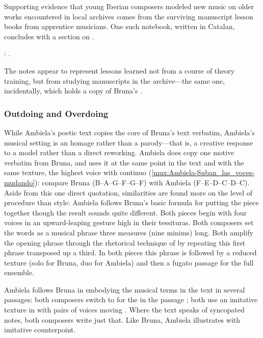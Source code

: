 Supporting evidence that young Iberian composers modeled new music on older
works encountered in local archives comes from the surviving manuscript lesson
books from apprentice musicians.
One such notebook, written in Catalan, concludes with a section on .%
\begin{Footnote}
    : .
\end{Footnote}
The notes appear to represent lessons learned not from a course of theory
training, but from studying manuscripts in the archive---the same one,
incidentally, which holds a copy of Bruna's .

\subsubsection{Outdoing and Overdoing}

While Ambiela's poetic text copies the core of Bruna's text verbatim, Ambiela's
musical setting is an homage rather than a parody---that is, a creative
response to a model rather than a direct reworking.
Ambiela does copy one motive verbatim from Bruna, and uses it at the same point
in the text and with the same texture, the highest voice with continuo
(\cref{mux:Ambiela-Suban_las_voces-mudando}): compare Bruna 
(B\fl--A--G--F\sh--G--F\sh) with Ambiela  (F--E--D--C\sh--D--C\sh).
Aside from this one direct quotation, similarities are found more on the level
of procedure than style: Ambiela follows Bruna's basic formula for putting the
piece together though the result sounds quite different.
Both pieces begin with four voices in an upward-leaping gesture high in their
tessituras.  
Both composers set the words  as a musical
phrase three measures (nine minims) long.
Both amplify the opening phrase through the rhetorical technique of
 by repeating this first phrase transposed up a third. 
In both pieces this phrase is followed by a reduced texture (solo for Bruna,
duo for Ambiela) and then a fugato passage for the full ensemble.

Ambiela follows Bruna in embodying the musical terms in the text in several
passages: both composers switch to \meterC{} for the  in the
passage ; both use an imitative texture in
 with pairs of voices moving .
Where the text speaks of syncopated notes, both composers write just that.
Like Bruna, Ambiela illustrates  with imitative counterpoint.

